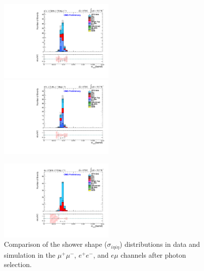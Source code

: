 \documentclass[oneside, a4paper, 11pt, ]{report}
\begin{document}
\begin{figure}
\includegraphics[width=0.5\textwidth]{Plots/ControlPlots/TTbarPhotonAnalysis/MuMu/Photons/SignalPhotons/Photon_sigma_ietaieta_barrel_splitTTbar_ratio.pdf}
\includegraphics[width=0.5\textwidth]{Plots/ControlPlots/TTbarPhotonAnalysis/EE/Photons/SignalPhotons/Photon_sigma_ietaieta_barrel_splitTTbar_ratio.pdf}\\
\begin{center}
\includegraphics[width=0.5\textwidth]{Plots/ControlPlots/TTbarPhotonAnalysis/EMu/Photons/SignalPhotons/Photon_sigma_ietaieta_barrel_splitTTbar_ratio.pdf}
\end{center}
\caption{Comparison of the shower shape ($\sigma_{i\eta i\eta}$) distributions in data and simulation in the $\mu^{+}\mu^{-}$, $e^{+}e^{-}$, and $e\mu$ channels after photon selection.}
\label{fig-photonShowerShape}
\end{figure}
\end{document}
